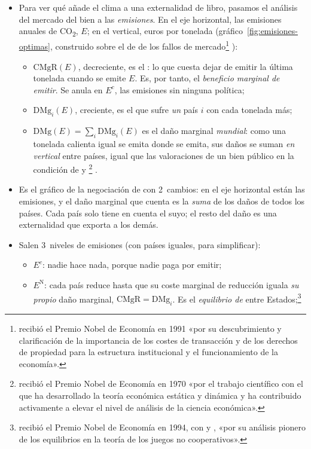 \documentclass[11pt]{article}
\begin{document}
\begin{itemize}
\item Para ver qué añade el clima a una externalidad de libro, pasamos el análisis del mercado del bien a las \emph{emisiones}. En el eje horizontal, las emisiones anuales de CO\textsubscript{2}, $E$; en el vertical, euros por tonelada (gráfico~\ref{fig:emisiones-optimas}, construido sobre el de  de los fallos de mercado\footnote{ recibió el Premio Nobel de Economía en 1991 «por su descubrimiento y clarificación de la importancia de los costes de transacción y de los derechos de propiedad para la estructura institucional y el funcionamiento de la economía»\nocite{Nobel1991Coase}.} ):
  \begin{itemize}
  \item $\mathrm{CMgR}(E)$, decreciente, es el : lo que cuesta dejar de emitir la última tonelada cuando se emite $E$. Es, por tanto, el \emph{beneficio marginal de emitir}. Se anula en $E^c$, las emisiones sin ninguna política;
  \item $\mathrm{DMg}_i(E)$, creciente, es el  que sufre \emph{un} país $i$ con cada tonelada más;
  \item $\mathrm{DMg}(E)=\sum_i\mathrm{DMg}_i(E)$ es el daño marginal \emph{mundial}: como una tonelada calienta igual se emita donde se emita, sus daños se suman \emph{en vertical} entre países, igual que las valoraciones de un bien público en la condición de  y \footnote{ recibió el Premio Nobel de Economía en 1970 «por el trabajo científico con el que ha desarrollado la teoría económica estática y dinámica y ha contribuido activamente a elevar el nivel de análisis de la ciencia económica»\nocite{Nobel1970Samuelson}.} .
  \end{itemize}
\item Es el gráfico de la negociación de   con 2~cambios: en el eje horizontal están las emisiones, y el daño marginal que cuenta es la \emph{suma} de los daños de todos los países. Cada país solo tiene en cuenta el suyo; el resto del daño es una externalidad que exporta a los demás.
\item Salen 3~niveles de emisiones (con países iguales, para simplificar):
  \begin{itemize}
  \item $E^c$: nadie hace nada, porque nadie paga por emitir;
  \item $E^{\mathrm{N}}$: cada país reduce hasta que su coste marginal de reducción iguala \emph{su propio} daño marginal, $\mathrm{CMgR}=\mathrm{DMg}_i$. Es el \emph{equilibrio de } entre Estados;\footnote{ recibió el Premio Nobel de Economía en 1994, con  y , «por su análisis pionero de los equilibrios en la teoría de los juegos no cooperativos»\nocite{Nobel1994Nash}.}

\end{itemize}
\end{itemize}
\end{document}
